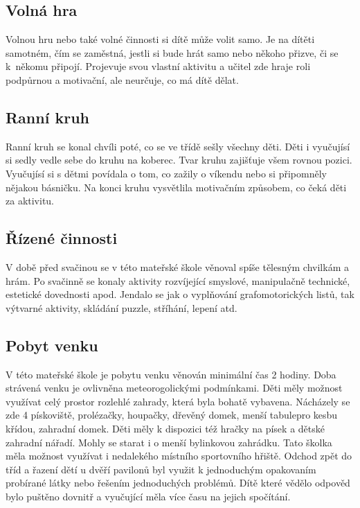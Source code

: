 		\subsection{Volná hra}

			Volnou hru nebo také volné činnosti si dítě může volit samo. Je na dítěti samotném, čím se zaměstná, jestli si bude hrát samo nebo někoho přizve, či se k někomu připojí. Projevuje svou vlastní aktivitu a učitel zde hraje roli podpůrnou a motivační, ale neurčuje, co má dítě dělat. 

		\subsection{Ranní kruh}

			Ranní kruh se konal chvíli poté, co se ve třídě sešly všechny děti. Děti i vyučujísí si sedly vedle sebe do kruhu na koberec. Tvar kruhu zajišťuje všem rovnou pozici. Vyučujísí si s dětmi povídala o tom, co zažily o víkendu nebo si připomněly nějakou básničku. Na konci kruhu vysvětlila motivačním způsobem, co čeká děti za aktivitu. 

		\subsection{Řízené činnosti}
		 	V době před svačinou se v této mateřské škole věnoval spíše tělesným chvilkám a hrám. Po svačinně se konaly aktivity rozvíjející smyslové, manipulačně technické, estetické dovednosti apod. Jendalo se jak o vyplňování grafomotorických listů, tak výtvarné aktivity, skládání puzzle, stříhání, lepení atd. 

		\subsection{Pobyt venku}
			V této mateřské škole je pobytu venku věnován minimální čas 2 hodiny. Doba strávená venku je ovlivněna meteorogolickými podmínkami. Děti měly možnost využívat celý prostor rozlehlé zahrady, která byla bohatě vybavena. Nácházely se zde 4 pískoviště, prolézačky, houpačky, dřevěný domek, menší tabulepro kesbu křídou, zahradní domek. Děti měly k dispozici též hračky na písek a dětské zahradní nářadí. Mohly se starat i o menší bylinkovou zahrádku. Tato školka měla možnost využívat i nedalekého místního sportovního hřiště. Odchod zpět do tříd a řazení dětí u dvěří pavilonů byl využit k jednoduchým opakovaním probírané látky nebo řešením jednoduchých problémů. Dítě které vědělo odpověd bylo puštěno dovnitř a vyučující měla více času na jejich spočítání.

